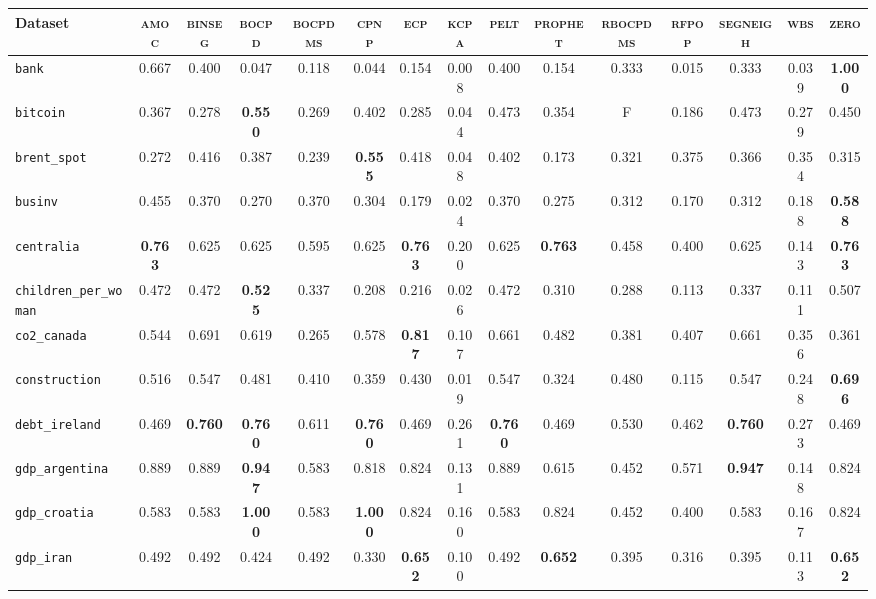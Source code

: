 \begin{tabular}{lcccccccccccccc}
Dataset & \textsc{amoc} & \textsc{binseg} & \textsc{bocpd} & \textsc{bocpdms} & \textsc{cpnp} & \textsc{ecp} & \textsc{kcpa} & \textsc{pelt} & \textsc{prophet} & \textsc{rbocpdms} & \textsc{rfpop} & \textsc{segneigh} & \textsc{wbs} & \textsc{zero}\\
\hline
\verb+bank+ & 0.667 & 0.400 & 0.047 & 0.118 & 0.044 & 0.154 & 0.008 & 0.400 & 0.154 & 0.333 & 0.015 & 0.333 & 0.039 & \textbf{1.000}\\
\verb+bitcoin+ & 0.367 & 0.278 & \textbf{0.550} & 0.269 & 0.402 & 0.285 & 0.044 & 0.473 & 0.354 & F & 0.186 & 0.473 & 0.279 & 0.450\\
\verb+brent_spot+ & 0.272 & 0.416 & 0.387 & 0.239 & \textbf{0.555} & 0.418 & 0.048 & 0.402 & 0.173 & 0.321 & 0.375 & 0.366 & 0.354 & 0.315\\
\verb+businv+ & 0.455 & 0.370 & 0.270 & 0.370 & 0.304 & 0.179 & 0.024 & 0.370 & 0.275 & 0.312 & 0.170 & 0.312 & 0.188 & \textbf{0.588}\\
\verb+centralia+ & \textbf{0.763} & 0.625 & 0.625 & 0.595 & 0.625 & \textbf{0.763} & 0.200 & 0.625 & \textbf{0.763} & 0.458 & 0.400 & 0.625 & 0.143 & \textbf{0.763}\\
\verb+children_per_woman+ & 0.472 & 0.472 & \textbf{0.525} & 0.337 & 0.208 & 0.216 & 0.026 & 0.472 & 0.310 & 0.288 & 0.113 & 0.337 & 0.111 & 0.507\\
\verb+co2_canada+ & 0.544 & 0.691 & 0.619 & 0.265 & 0.578 & \textbf{0.817} & 0.107 & 0.661 & 0.482 & 0.381 & 0.407 & 0.661 & 0.356 & 0.361\\
\verb+construction+ & 0.516 & 0.547 & 0.481 & 0.410 & 0.359 & 0.430 & 0.019 & 0.547 & 0.324 & 0.480 & 0.115 & 0.547 & 0.248 & \textbf{0.696}\\
\verb+debt_ireland+ & 0.469 & \textbf{0.760} & \textbf{0.760} & 0.611 & \textbf{0.760} & 0.469 & 0.261 & \textbf{0.760} & 0.469 & 0.530 & 0.462 & \textbf{0.760} & 0.273 & 0.469\\
\verb+gdp_argentina+ & 0.889 & 0.889 & \textbf{0.947} & 0.583 & 0.818 & 0.824 & 0.131 & 0.889 & 0.615 & 0.452 & 0.571 & \textbf{0.947} & 0.148 & 0.824\\
\verb+gdp_croatia+ & 0.583 & 0.583 & \textbf{1.000} & 0.583 & \textbf{1.000} & 0.824 & 0.160 & 0.583 & 0.824 & 0.452 & 0.400 & 0.583 & 0.167 & 0.824\\
\verb+gdp_iran+ & 0.492 & 0.492 & 0.424 & 0.492 & 0.330 & \textbf{0.652} & 0.100 & 0.492 & \textbf{0.652} & 0.395 & 0.316 & 0.395 & 0.113 & \textbf{0.652}\\

\end{tabular}
